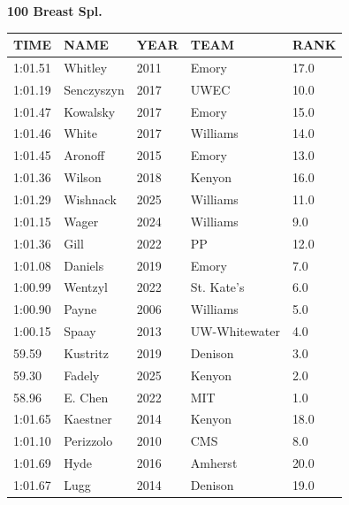 \begin{table}[H]
\centering
\begin{minipage}[t]{0.6\textwidth}
\centering
\textbf{100 Breast Spl.}\\[0.1cm]
\begin{tabular}{@{}p{1.8cm}p{2.8cm}p{1.2cm}p{1.4cm}p{0.8cm}@{}}
\hline
    \textbf{TIME} & \textbf{NAME} & \textbf{YEAR} & \textbf{TEAM} & \textbf{RANK} \\
\hline
    1:01.51 & Whitley & 2011 & Emory & 17.0 \\
    1:01.19 & Senczyszyn & 2017 & UWEC & 10.0 \\
    1:01.47 & Kowalsky & 2017 & Emory & 15.0 \\
    1:01.46 & White & 2017 & Williams & 14.0 \\
    1:01.45 & Aronoff & 2015 & Emory & 13.0 \\
    1:01.36 & Wilson & 2018 & Kenyon & 16.0 \\
    1:01.29 & Wishnack & 2025 & Williams & 11.0 \\
    1:01.15 & Wager & 2024 & Williams & 9.0 \\
    1:01.36 & Gill & 2022 & PP & 12.0 \\
    1:01.08 & Daniels & 2019 & Emory & 7.0 \\
    1:00.99 & Wentzyl & 2022 & St. Kate's & 6.0 \\
    1:00.90 & Payne & 2006 & Williams & 5.0 \\
    1:00.15 & Spaay & 2013 & UW-Whitewater & 4.0 \\
    59.59 & Kustritz & 2019 & Denison & 3.0 \\
    59.30 & Fadely & 2025 & Kenyon & 2.0 \\
    58.96 & E. Chen & 2022 & MIT & 1.0 \\
    1:01.65 & Kaestner & 2014 & Kenyon & 18.0 \\
    1:01.10 & Perizzolo & 2010 & CMS & 8.0 \\
    1:01.69 & Hyde & 2016 & Amherst & 20.0 \\
    1:01.67 & Lugg & 2014 & Denison & 19.0 \\
\hline
\end{tabular}
\end{minipage}
\end{table}

